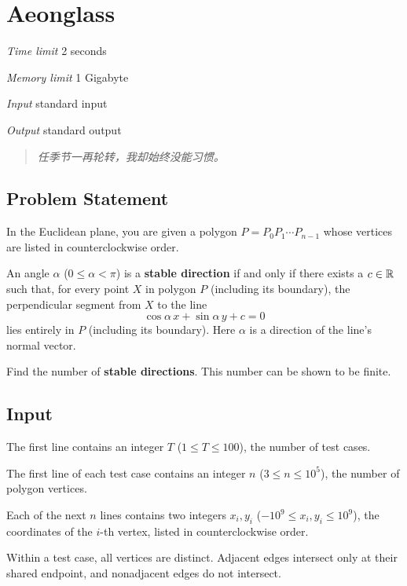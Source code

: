\section[K. Aeonglass]{ Aeonglass}

\textit{Time limit}   2 seconds

\textit{Memory limit} 1 Gigabyte

\textit{Input} \qquad standard input

\textit{Output} \qquad standard output


\begin{quote}
	\textit{任季节一再轮转，我却始终没能习惯。}
\end{quote}

\subsection{Problem Statement}

In the Euclidean plane, you are given a polygon $P=P_0P_1\cdots P_{n-1}$ whose vertices are listed in counterclockwise order.

An angle $\alpha$ ($0 \le \alpha < \pi$) is a \textbf{stable direction} if and only if there exists a $c \in \mathbb{R}$ such that, for every point $X$ in polygon $P$ (including its boundary), the perpendicular segment from $X$ to the line
\[
	\cos \alpha\,x + \sin \alpha\,y + c = 0
\]
lies entirely in $P$ (including its boundary). Here $\alpha$ is a direction of the line's normal vector.


Find the number of \textbf{stable directions}. This number can be shown to be finite.

\subsection{Input}

The first line contains an integer $T$ ($1 \le T \le 100$), the number of test cases.

The first line of each test case contains an integer $n$ ($3 \le n \le 10^5$), the number of polygon vertices.

Each of the next $n$ lines contains two integers $x_i,y_i$ ($-10^9 \le x_i,y_i \le 10^9$), the coordinates of the $i$-th vertex, listed in counterclockwise order.

Within a test case, all vertices are distinct. Adjacent edges intersect only at their shared endpoint, and nonadjacent edges do not intersect.


